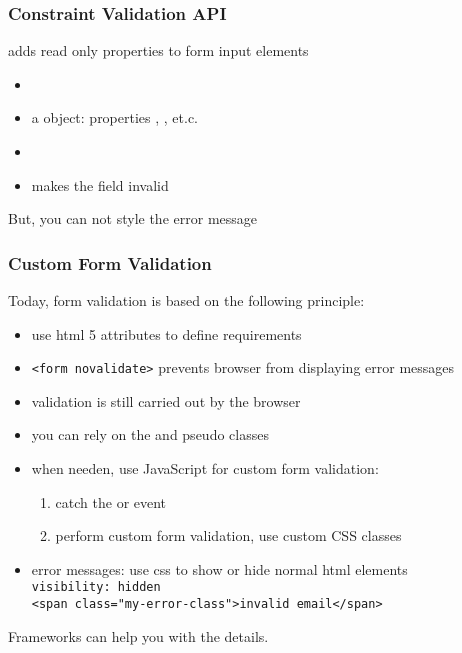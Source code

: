 \begin{frame}[fragile] \frametitle{Constraint Validation API}
adds read only properties to form input elements
\begin{itemize}
  \item {}
  \item {} a  object: properties , , et.c.
  \item {}
  \item {} makes the field invalid
\end{itemize}
\vspace{5mm}
But, you can not style the error message
\end{frame}

\begin{frame}[fragile] \frametitle{Custom Form Validation}
Today, form validation is based on the following principle:
\begin{itemize}
  \item use html 5 attributes to define requirements
  \item \lstinline[style=htmlcssjs]{<form novalidate>} prevents browser from displaying error messages
  \item validation is still carried out by the browser
  \item you can rely on the  and  pseudo classes
  \item when needen, use JavaScript for custom form validation:
  \begin{enumerate}
    \item catch the  or  event
    \item perform custom form validation, use custom CSS classes
  \end{enumerate}
  \item error messages: use css to show or hide normal html elements
          \\ \lstinline[style=htmlcssjs]{visibility: hidden}
          \\ \lstinline[style=htmlcssjs]{<span class="my-error-class">invalid email</span>}
\end{itemize}
\vspace{5mm}
Frameworks can help you with the details.
\end{frame}

